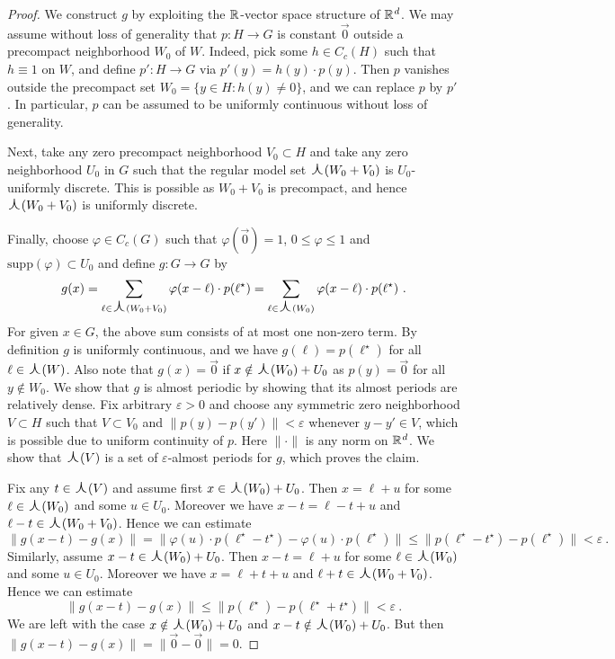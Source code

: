 \documentclass[11pt, a4wide]{amsart}
\newcommand{\ts}{\hspace{0.5pt}}
\newcommand{\RR}{\mathbb{R}\ts}
\newcommand{\oplam}{\mbox{\Large $\curlywedge$}}
\numberwithin{lemma}{section}
\begin{document}
\begin{proof}
We construct $g$ by exploiting the $\RR$-vector space structure of $\RR^d$. We may assume without loss of generality that $p: H\to G$ is constant $\vec{0}$ outside a precompact neighborhood $W_0$ of $W$. Indeed, pick some $h \in C_c(H)$ such that $h \equiv 1$ on $W$, and define $p': H \to G$ via $p'(y)=h(y)\cdot p(y)$. Then $p$ vanishes outside the precompact set $W_0= \{ y \in H : h(y) \neq 0 \}$, and we can replace $p$ by $p'$.  In particular, $p$ can be assumed to be uniformly continuous without loss of generality.

Next, take any zero precompact neighborhood $V_0\subset H$ and take any zero neighborhood $U_0$ in $G$ such that the regular model set $\oplam(W_0+V_0)$ is $U_0$-uniformly discrete. This is possible as $W_0+V_0$ is precompact, and hence $\oplam(W_0+V_0)$ is uniformly discrete.

Finally, choose $\varphi\in C_c(G)$ such that $\varphi(\vec{0})=1$, $0\le \varphi \le 1$ and $\mathrm{supp}(\varphi)\subset U_0$ and define $g:G\to G$ by
%
\begin{displaymath}
g(x)=\sum_{\ell \in \oplam(W_0+V_0)} \varphi(x-\ell) \cdot p(\ell^\star) =\sum_{\ell \in \oplam(W_0)} \varphi(x-\ell) \cdot p(\ell^\star)\ .
\end{displaymath}
%
For given $x\in G$, the above sum consists of at most one non-zero term. By definition $g$ is uniformly continuous, and we have $g(\ell)=p(\ell^\star)$ for all $\ell\in\oplam(W)$. Also note that $g(x)=\vec{0}$ if $x\notin \oplam(W_0)+U_0$ as $p(y)=\vec{0}$ for all $y \notin W_0$.  We show that $g$ is almost periodic by showing that its almost periods are relatively dense. Fix arbitrary $\varepsilon>0$ and choose any symmetric zero neighborhood $V\subset H$ such that $V\subset V_0$ and $\| p(y)-p(y')\|<\varepsilon$ whenever $y-y'\in V$, which is possible due to uniform continuity of $p$. Here $\|\cdot\|$ is any norm on $\RR^d$.  We show that $\oplam(V)$ is a set of $\varepsilon$-almost periods for $g$, which proves the claim.

Fix any $t\in \oplam(V)$ and assume first $x\in \oplam(W_0)+U_0$. Then $x=\ell+u$ for some $\ell\in \oplam(W_0)$ and some $u\in U_0$. Moreover we have $x-t=\ell-t+u$ and $\ell-t\in \oplam(W_0+V_0)$. Hence we can estimate
%
\begin{displaymath}
\|g(x-t)-g(x)\|=\|\varphi(u)\cdot p(\ell^\star-t^\star)-\varphi(u)\cdot p(\ell^\star)\| \le \|p(\ell^\star-t^\star)-p(\ell^\star)\|< \varepsilon \ .
\end{displaymath}
%
Similarly, assume $x-t\in \oplam(W_0)+U_0$. Then $x-t=\ell+u$ for some $\ell\in \oplam(W_0)$ and some $u\in U_0$. Moreover we have $x=\ell+t+u$ and $\ell+t\in \oplam(W_0+V_0)$. Hence we can estimate
%
\begin{displaymath}
\|g(x-t)-g(x)\|\le \|p(\ell^\star)-p(\ell^\star+t^\star)\|< \varepsilon \ .
\end{displaymath}
%
We are left with the case $x\notin \oplam(W_0)+U_0$ and $x-t\notin \oplam(W_0)+U_0$. But then $\|g(x-t)-g(x)\|=\|\vec{0}-\vec{0}\|=0$.


\end{proof}
\end{document}

